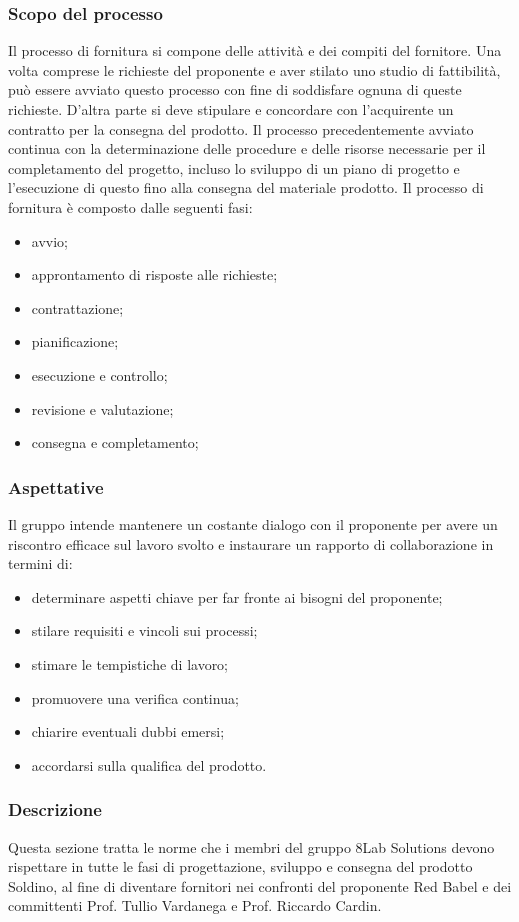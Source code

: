 \subsubsection{Scopo del processo}
Il processo di fornitura si compone delle attività e dei compiti del fornitore. Una volta comprese le richieste del proponente e aver stilato uno studio di fattibilità, può essere avviato questo processo con fine di soddisfare ognuna di queste richieste. D'altra parte si deve stipulare e concordare con l'acquirente un contratto per la consegna del prodotto.
Il processo precedentemente avviato continua con la determinazione delle procedure e delle risorse necessarie per il completamento del progetto, incluso lo sviluppo di un piano di progetto e l'esecuzione di questo fino alla consegna del materiale prodotto.
Il processo di fornitura è composto dalle seguenti fasi:
\begin{itemize}
	\item avvio;
	\item approntamento di risposte alle richieste;
	\item contrattazione;
	\item pianificazione;
	\item esecuzione e controllo;
	\item revisione e valutazione;
	\item consegna e completamento;
\end{itemize}
\subsubsection{Aspettative}
Il gruppo intende mantenere un costante dialogo con il proponente per avere un riscontro efficace sul lavoro svolto e instaurare un rapporto di collaborazione in termini di:
\begin{itemize}
	\item determinare aspetti chiave per far fronte ai bisogni del proponente;
	\item stilare requisiti e vincoli sui processi;
	\item stimare le tempistiche di lavoro;
	\item promuovere una verifica continua;
	\item chiarire eventuali dubbi emersi;
	\item accordarsi sulla qualifica del prodotto.
\end{itemize}
\subsubsection{Descrizione}
Questa sezione tratta le norme che i membri del gruppo 8Lab Solutions devono rispettare in tutte le fasi di progettazione, sviluppo e consegna del prodotto Soldino, al fine di diventare fornitori nei confronti del proponente Red Babel e dei committenti Prof. Tullio Vardanega e Prof. Riccardo Cardin.
